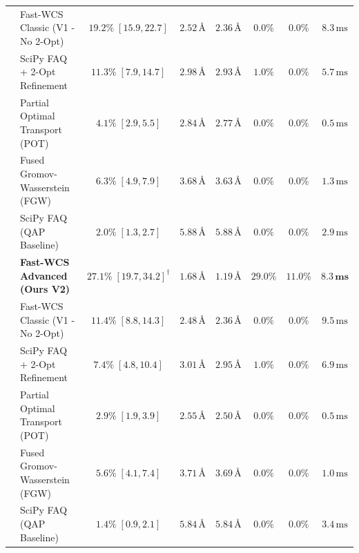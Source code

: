\documentclass[conference]{IEEEtran}
\begin{document}
\begin{table}[t]
\begin{tabular*}{\textwidth}{@{\extracolsep{\fill}}llcccccc@{}}
& Fast-WCS Classic (V1 - No 2-Opt) & $19.2\% \; [15.9, 22.7]$ & $2.52\,\text{\AA}$ & $2.36\,\text{\AA}$ & $0.0\%$ & $0.0\%$ & $8.3\,\text{ms}$ \\
& SciPy FAQ + 2-Opt Refinement & $11.3\% \; [7.9, 14.7]$ & $2.98\,\text{\AA}$ & $2.93\,\text{\AA}$ & $1.0\%$ & $0.0\%$ & $5.7\,\text{ms}$ \\
& Partial Optimal Transport (POT) \cite{peyre2019computational} & $4.1\% \; [2.9, 5.5]$ & $2.84\,\text{\AA}$ & $2.77\,\text{\AA}$ & $0.0\%$ & $0.0\%$ & $0.5\,\text{ms}$ \\
& Fused Gromov-Wasserstein (FGW) \cite{titouan2019optimal} & $6.3\% \; [4.9, 7.9]$ & $3.68\,\text{\AA}$ & $3.63\,\text{\AA}$ & $0.0\%$ & $0.0\%$ & $1.3\,\text{ms}$ \\
& SciPy FAQ (QAP Baseline) \cite{vogelstein2015fast} & $2.0\% \; [1.3, 2.7]$ & $5.88\,\text{\AA}$ & $5.88\,\text{\AA}$ & $0.0\%$ & $0.0\%$ & $2.9\,\text{ms}$ \\
\midrule
{}
& \textbf{Fast-WCS Advanced (Ours V2)} & $\mathbf{27.1\% \; [19.7, 34.2]^\dagger}$ & $\mathbf{1.68\,\text{\AA}}$ & $\mathbf{1.19\,\text{\AA}}$ & $\mathbf{29.0\%}$ & $\mathbf{11.0\%}$ & $\mathbf{8.3\,\text{ms}}$ \\
& Fast-WCS Classic (V1 - No 2-Opt) & $11.4\% \; [8.8, 14.3]$ & $2.48\,\text{\AA}$ & $2.36\,\text{\AA}$ & $0.0\%$ & $0.0\%$ & $9.5\,\text{ms}$ \\
& SciPy FAQ + 2-Opt Refinement & $7.4\% \; [4.8, 10.4]$ & $3.01\,\text{\AA}$ & $2.95\,\text{\AA}$ & $1.0\%$ & $0.0\%$ & $6.9\,\text{ms}$ \\
& Partial Optimal Transport (POT) \cite{peyre2019computational} & $2.9\% \; [1.9, 3.9]$ & $2.55\,\text{\AA}$ & $2.50\,\text{\AA}$ & $0.0\%$ & $0.0\%$ & $0.5\,\text{ms}$ \\
& Fused Gromov-Wasserstein (FGW) \cite{titouan2019optimal} & $5.6\% \; [4.1, 7.4]$ & $3.71\,\text{\AA}$ & $3.69\,\text{\AA}$ & $0.0\%$ & $0.0\%$ & $1.0\,\text{ms}$ \\
& SciPy FAQ (QAP Baseline) \cite{vogelstein2015fast} & $1.4\% \; [0.9, 2.1]$ & $5.84\,\text{\AA}$ & $5.84\,\text{\AA}$ & $0.0\%$ & $0.0\%$ & $3.4\,\text{ms}$ \\
\bottomrule
\end{tabular*}
\end{table}
\end{document}
